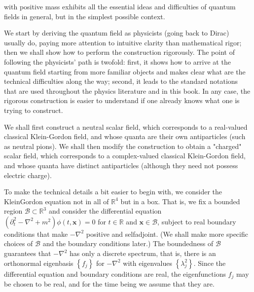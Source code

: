 \documentclass[10pt, letterpaper]{article}
\begin{document}
with positive mass exhibits all the essential ideas and difficulties of quantum fields in general, but in the simplest possible context.

We start by deriving the quantum field as physicists (going back to Dirac) usually do, paying more attention to intuitive clarity than mathematical rigor; then we shall show how to perform the construction rigorously. The point of following the physicists' path is twofold: first, it shows how to arrive at the quantum field starting from more familiar objects and makes clear what are the technical difficulties along the way; second, it leads to the standard notations that are used throughout the physics literature and in this book. In any case, the rigorous construction is easier to understand if one already knows what one is trying to construct.

We shall first construct a neutral scalar field, which corresponds to a real-valued classical Klein-Gordon field, and whose quanta are their own antiparticles (such as neutral pions). We shall then modify the construction to obtain a "charged" scalar field, which corresponds to a complex-valued classical Klein-Gordon field, and whose quanta have distinct antiparticles (although they need not possess electric charge).

To make the technical details a bit easier to begin with, we consider the KleinGordon equation not in all of $\mathbb{R}^{4}$ but in a box. That is, we fix a bounded region $\mathcal{B} \subset \mathbb{R}^{3}$ and consider the differential equation $\left(\partial_{t}^{2}-\nabla^{2}+m^{2}\right) \phi(t, \mathbf{x})=0$ for $t \in \mathbb{R}$ and $\mathbf{x} \in \mathcal{B}$, subject to real boundary conditions that make $-\nabla^{2}$ positive and selfadjoint. (We shall make more specific choices of $\mathcal{B}$ and the boundary conditions later.) The boundedness of $\mathcal{B}$ guarantees that $-\nabla^{2}$ has only a discrete spectrum, that is, there is an orthonormal eigenbasis $\left\{f_{j}\right\}$ for $-\nabla^{2}$ with eigenvalues $\left\{\lambda_{j}^{2}\right\}$. Since the differential equation and boundary conditions are real, the eigenfunctions $f_{j}$ may be chosen to be real, and for the time being we assume that they are.
\end{document}
